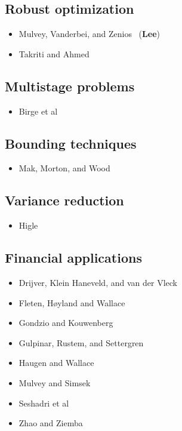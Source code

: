\documentclass[12pt]{article}
\begin{document}
\subsection{Robust optimization}

\begin{itemize}
\item
Mulvey, Vanderbei, and Zenios~\cite{mulvey1} ({\bf Lee})
\item
Takriti and Ahmed~\cite{takriti2}
\end{itemize}

\subsection{Multistage problems}

\begin{itemize}
\item
Birge et al~\cite{birge2}
\end{itemize}

\subsection{Bounding techniques}

\begin{itemize}
\item
Mak, Morton, and Wood~\cite{mak1}
\end{itemize}

\subsection{Variance reduction}

\begin{itemize}
\item
Higle~\cite{higle4}
\end{itemize}

\subsection{Financial applications}

\begin{itemize}
\item
Drijver, Klein Haneveld, and van der Vleck~\cite{drijver1}
\item
Fleten, H{\o}yland and Wallace~\cite{fleten1}
\item
Gondzio and Kouwenberg~\cite{gondzio8}
\item
Gulpinar, Rustem, and Settergren~\cite{gulpinar1}
\item
Haugen and Wallace~\cite{haugen1}
\item
Mulvey and Simsek~\cite{mulvey6}
\item
Seshadri et al~\cite{seshadri1}
\item
Zhao and Ziemba~\cite{yzhao1}
\end{itemize}
\end{document}
